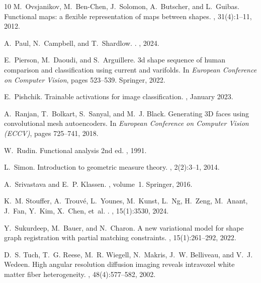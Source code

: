 \documentclass[11pt]{article}
\begin{document}
\begin{thebibliography}{10}
M.~Ovsjanikov, M.~Ben-Chen, J.~Solomon, A.~Butscher, and L.~Guibas.
\newblock Functional maps: a flexible representation of maps between shapes.
, 31(4):1--11, 2012.

A.~Paul, N.~Campbell, and T.~Shardlow.
.
, 2024.

E.~Pierson, M.~Daoudi, and S.~Arguillere.
\newblock 3d shape sequence of human comparison and classification using current and varifolds.
\newblock In {\em European Conference on Computer Vision}, pages 523--539. Springer, 2022.

E.~Pishchik.
\newblock Trainable activations for image classification.
, January 2023.

A.~Ranjan, T.~Bolkart, S.~Sanyal, and M.~J. Black.
\newblock Generating {3D} faces using convolutional mesh autoencoders.
\newblock In {\em European Conference on Computer Vision (ECCV)}, pages 725--741, 2018.

W.~Rudin.
\newblock Functional analysis 2nd ed.
, 1991.

L.~Simon.
\newblock Introduction to geometric measure theory.
, 2(2):3--1, 2014.

A.~Srivastava and E.~P. Klassen.
, volume~1.
\newblock Springer, 2016.

K.~M. Stouffer, A.~Trouv{\'e}, L.~Younes, M.~Kunst, L.~Ng, H.~Zeng, M.~Anant, J.~Fan, Y.~Kim, X.~Chen, et~al.
.
, 15(1):3530, 2024.

Y.~Sukurdeep, M.~Bauer, and N.~Charon.
\newblock A new variational model for shape graph registration with partial matching constraints.
, 15(1):261--292, 2022.

D.~S. Tuch, T.~G. Reese, M.~R. Wiegell, N.~Makris, J.~W. Belliveau, and V.~J. Wedeen.
\newblock High angular resolution diffusion imaging reveals intravoxel white matter fiber heterogeneity.
, 48(4):577--582, 2002.


\end{thebibliography}
\end{document}
